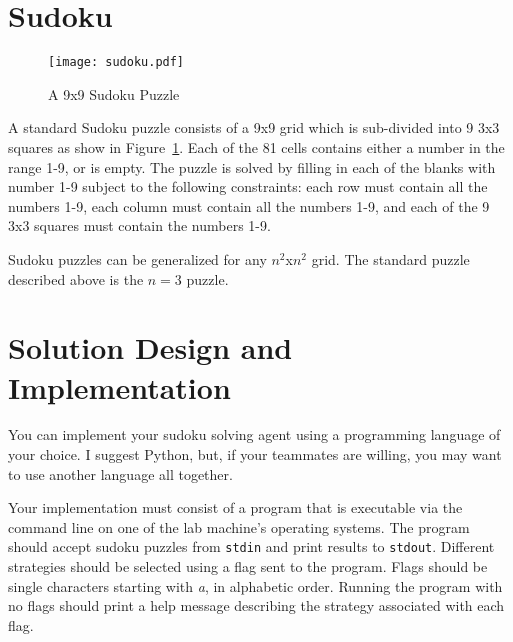 \documentclass[letterpaper]{article}
\begin{document}
\section{Sudoku}

\begin{figure}[h] 
\begin{center}
\texttt{[image: sudoku.pdf]}
\caption{A 9x9 Sudoku Puzzle}
\label{fig:sudoku}  %
\end{center}
\end{figure}

A standard Sudoku puzzle consists of a 9x9 grid which is sub-divided
into 9 3x3 squares as show in 
Figure~\ref{fig:sudoku}. 
Each of the 81 cells contains either a number in the range 1-9, or is empty. The
puzzle is solved by filling in each of the blanks with number 1-9
subject to the following constraints: each row must contain all the
numbers 1-9, each column must contain all the numbers 1-9, and each of
the 9 3x3 squares must contain the numbers 1-9.

Sudoku puzzles can be generalized for any $n^2$x$n^2$ grid.  The
standard puzzle described above is the $n=3$ puzzle.

\section{Solution Design and Implementation}

You can implement your sudoku solving agent using a programming
language of your choice. I suggest Python, but, if your teammates are
willing, you may want to use another language all together.

Your implementation must consist of a program that is executable via
the command line on one of the lab machine's operating systems. The
program should accept sudoku puzzles from {\tt stdin} and print
results to {\tt stdout}. Different strategies should be selected using
a flag sent to the program. Flags should be single characters starting
with {\em a}, in alphabetic order. Running the program with no flags
should print a help message describing the strategy associated with
each flag.
\end{document}
